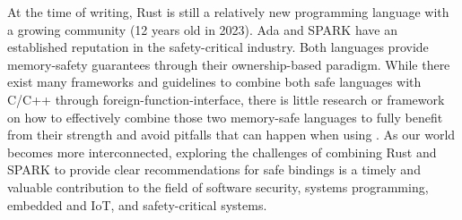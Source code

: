\documentclass[nomenclature, english, bibtex]{kththesis}
\newcommand*{\generalExpl}[1]{\todo[inline]{#1}}
\newcommand*{\engExpl}[1]{\todo[inline, backgroundcolor=kth-lightgreen40]{#1}} %
\begin{document}
  



At the time of writing, Rust is still a relatively new programming language with a growing community (12 years old in 2023). Ada and SPARK have an established reputation in the safety-critical industry. Both languages provide \gls{memory-safety} guarantees through their \gls{ownership}-based paradigm. While there exist many frameworks and guidelines to combine both safe languages with C/C++ through \gls{foreign-function-interface}, there is little research or framework on how to effectively combine those two memory-safe languages to fully benefit from their strength and avoid pitfalls that can happen when using . As our world becomes more interconnected, exploring the challenges of combining Rust and SPARK to provide clear recommendations for safe bindings is a timely and valuable contribution to the field of software security, systems programming, embedded and \gls{IoT}, and \gls{safety-critical} systems.
\end{document}
